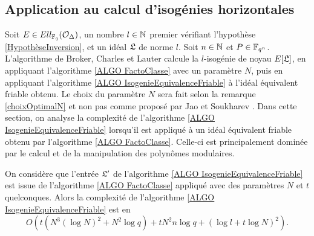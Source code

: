 \subsection{Application au calcul d'isogénies horizontales}\label{SECTION Broker}



Soit $E\in Ell_{\mathbb{F}_{q}}(\mathcal{O}_{\Delta})$, un nombre $l\in\mathbb{N}$ premier vérifiant l'hypothèse \ref{HypothèseInversion}, et un idéal $\mathfrak{L}$ de norme $l$. Soit $n\in\mathbb{N}$ et $P\in\mathbb{F}_{q^{n}}$. L'algorithme de Broker, Charles et Lauter \cite{BrokerCharlesLauter} calcule la $l$-isogénie de noyau $E[\mathfrak{L}]$, en appliquant l'algorithme \ref{ALGO FactoClasse} avec un paramètre $N$, puis en appliquant l'algorithme \ref{ALGO IsogenieEquivalenceFriable} à l'idéal équivalent friable obtenu. Le choix du paramètre $N$ sera fait selon la remarque \ref{choixOptimalN} et non pas comme proposé par Jao et Soukharev \cite{JaoSoukharev}. Dans cette section, on analyse la complexité de l'algorithme \ref{ALGO IsogenieEquivalenceFriable} lorsqu'il est appliqué à un idéal équivalent friable obtenu par l'algorithme \ref{ALGO FactoClasse}. Celle-ci est principalement dominée par le calcul et de la manipulation des polynômes modulaires. 


\begin{Prop}\label{COMPLEX equivalenceFriablePostFactoClass}
	On considère que l'entrée $\mathfrak{L}'$ de l'algorithme \ref{ALGO IsogenieEquivalenceFriable} est issue de l'algorithme \ref{ALGO FactoClasse} appliqué avec des paramètres $N$ et $t$ quelconques. Alors la complexité de  l'algorithme \ref{ALGO IsogenieEquivalenceFriable} est en 
	\begin{equation*}
		O\left( t\left(N^3(\log N)^{2} + N^2\log q \right) + tN^2n\log q + \left( \log l + t\log N\right)^{2}\right). 
	\end{equation*}
	
\end{Prop}


